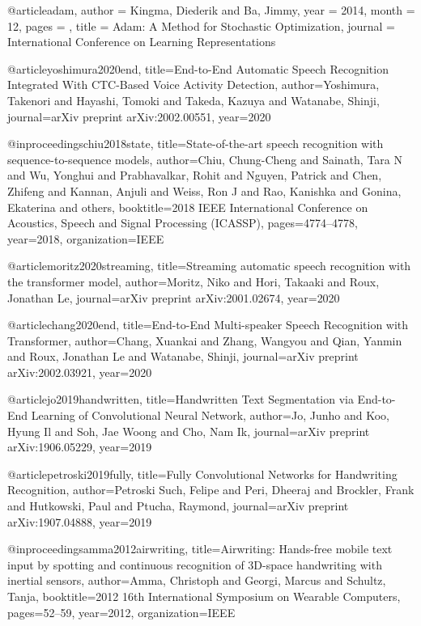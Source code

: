 @article{adam,
author = {Kingma, Diederik and Ba, Jimmy},
year = {2014},
month = {12},
pages = {},
title = {Adam: A Method for Stochastic Optimization},
journal = {International Conference on Learning Representations}
}


@article{yoshimura2020end,
  title={End-to-End Automatic Speech Recognition Integrated With CTC-Based Voice Activity Detection},
  author={Yoshimura, Takenori and Hayashi, Tomoki and Takeda, Kazuya and Watanabe, Shinji},
  journal={arXiv preprint arXiv:2002.00551},
  year={2020}
}

@inproceedings{chiu2018state,
  title={State-of-the-art speech recognition with sequence-to-sequence models},
  author={Chiu, Chung-Cheng and Sainath, Tara N and Wu, Yonghui and Prabhavalkar, Rohit and Nguyen, Patrick and Chen, Zhifeng and Kannan, Anjuli and Weiss, Ron J and Rao, Kanishka and Gonina, Ekaterina and others},
  booktitle={2018 IEEE International Conference on Acoustics, Speech and Signal Processing (ICASSP)},
  pages={4774--4778},
  year={2018},
  organization={IEEE}
}

@article{moritz2020streaming,
  title={Streaming automatic speech recognition with the transformer model},
  author={Moritz, Niko and Hori, Takaaki and Roux, Jonathan Le},
  journal={arXiv preprint arXiv:2001.02674},
  year={2020}
}

@article{chang2020end,
  title={End-to-End Multi-speaker Speech Recognition with Transformer},
  author={Chang, Xuankai and Zhang, Wangyou and Qian, Yanmin and Roux, Jonathan Le and Watanabe, Shinji},
  journal={arXiv preprint arXiv:2002.03921},
  year={2020}
}

@article{jo2019handwritten,
  title={Handwritten Text Segmentation via End-to-End Learning of Convolutional Neural Network},
  author={Jo, Junho and Koo, Hyung Il and Soh, Jae Woong and Cho, Nam Ik},
  journal={arXiv preprint arXiv:1906.05229},
  year={2019}
}

@article{petroski2019fully,
  title={Fully Convolutional Networks for Handwriting Recognition},
  author={Petroski Such, Felipe and Peri, Dheeraj and Brockler, Frank and Hutkowski, Paul and Ptucha, Raymond},
  journal={arXiv preprint arXiv:1907.04888},
  year={2019}
}

@inproceedings{amma2012airwriting,
  title={Airwriting: Hands-free mobile text input by spotting and continuous recognition of 3D-space handwriting with inertial sensors},
  author={Amma, Christoph and Georgi, Marcus and Schultz, Tanja},
  booktitle={2012 16th International Symposium on Wearable Computers},
  pages={52--59},
  year={2012},
  organization={IEEE}
}